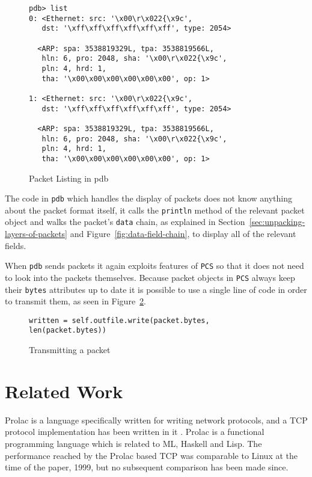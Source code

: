 \documentclass[pdftex]{article}
\begin{document}
\begin{figure}
  \centering
\begin{lstlisting}
pdb> list
0: <Ethernet: src: '\x00\r\x022{\x9c', 
   dst: '\xff\xff\xff\xff\xff\xff', type: 2054>

  <ARP: spa: 3538819329L, tpa: 3538819566L, 
   hln: 6, pro: 2048, sha: '\x00\r\x022{\x9c', 
   pln: 4, hrd: 1, 
   tha: '\x00\x00\x00\x00\x00\x00', op: 1>

1: <Ethernet: src: '\x00\r\x022{\x9c', 
   dst: '\xff\xff\xff\xff\xff\xff', type: 2054>

  <ARP: spa: 3538819329L, tpa: 3538819566L, 
   hln: 6, pro: 2048, sha: '\x00\r\x022{\x9c', 
   pln: 4, hrd: 1, 
   tha: '\x00\x00\x00\x00\x00\x00', op: 1>
 \end{lstlisting}
 \caption{Packet Listing in pdb}
  \label{fig:packet-listing}
\end{figure}

The code in \verb|pdb| which handles the display of packets does
not know anything about the packet format itself, it calls the
\verb|println| method of the relevant packet object and walks the
packet's \verb|data| chain, as explained in
Section~\ref{sec:unpacking-layers-of-packets} and
Figure~\ref{fig:data-field-chain}, to display all of the relevant
fields.

When \verb|pdb| sends packets it again exploits features of
\verb|PCS| so that it does not need to look into the packets
themselves.  Because packet objects in \verb|PCS| always keep their
\verb|bytes| attributes up to date it is possible to use a single
line of code in order to transmit them, as seen in
Figure~\ref{fig:transmitting-a-packet}.

\begin{figure}
  \centering
\begin{verbatim}
written = self.outfile.write(packet.bytes, len(packet.bytes))
\end{verbatim}
  \caption{Transmitting a packet}
  \label{fig:transmitting-a-packet}
\end{figure}

\section{Related Work}
\label{sec:related-work}

Prolac is a language specifically written for writing network
protocols, and a TCP protocol implementation has been written in it
\cite{kohler:sigcomm99}.  Prolac is a functional programming language
which is related to ML, Haskell and Lisp.  The performance reached by
the Prolac based TCP was comparable to Linux at the time of the paper,
1999, but no subsequent comparison has been made since.
\end{document}
